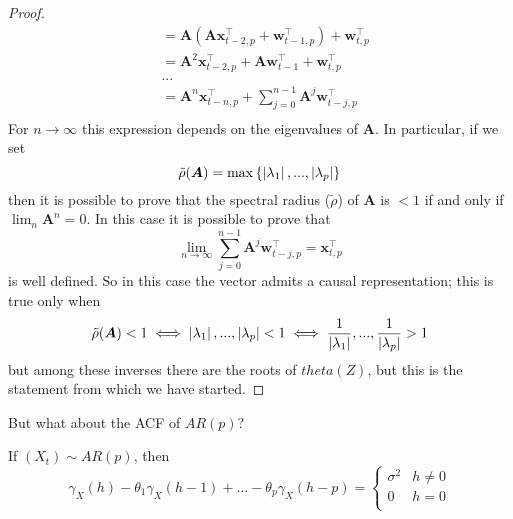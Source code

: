 \begin{proof}
\begin{equation*}
\begin{split}
            &=\boldsymbol{A}(\boldsymbol{A}\boldsymbol{x}_{t-2,p}^\intercal+\boldsymbol{w}_{t-1,p}^\intercal)+\boldsymbol{w}_{t,p}^\intercal\\
            &=\boldsymbol{A}^2\boldsymbol{x}_{t-2,p}^\intercal+\boldsymbol{A}\boldsymbol{w}_{t-1}^\intercal+\boldsymbol{w}_{t,p}^\intercal\\
            &...\\
            &=\boldsymbol{A}^n\boldsymbol{x}_{t-n,p}^\intercal+\sum_{j=0}^{n-1}\boldsymbol{A}^j\boldsymbol{w}_{t-j,p}^\intercal\\
        \end{split}
    \end{equation*}
    For $n\to\infty$ this expression depends on the eigenvalues of $\boldsymbol{A}$. In particular, if we set
    \[
        \tilde{\rho}(\boldsymbol{A})=\max\left\{\left|\lambda_1\right|,...,\left|\lambda_p\right|\right\}  
    \]
    then it is possible to prove that the spectral radius ($\tilde{\rho}$) of $\boldsymbol{A}$ is $<1$ if and only if $\lim_n\boldsymbol{A}^n=0$. In this case it is possible to prove that
    \[
        \lim_{n\to\infty}\sum_{j=0}^{n-1}\boldsymbol{A}^j\boldsymbol{w}_{t-j,p}^\intercal=\boldsymbol{x}_{t,p}^\intercal  
    \]
    is well defined. So in this case the vector admits a causal representation; this is true only when
    \[
        \tilde{\rho}(\boldsymbol{A})<1\iff\left|\lambda_1\right|,...,\left|\lambda_p\right|<1\iff\frac{1}{\left|\lambda_1\right|},...,\frac{1}{\left|\lambda_p\right|}>1  
    \]
    but among these inverses there are the roots of $theta(Z)$, but this is the statement from which we have started.
\end{proof}

But what about the ACF of $AR(p)$?

\begin{theorem}
    If $(X_t)\sim AR(p)$, then
    \[
        \gamma_X(h)-\theta_1\gamma_X(h-1)+...-\theta_p\gamma_X(h-p)=
        \begin{cases}
            \sigma^2&h\ne0\\
            0&h=0\\
        \end{cases}  
    \]
\end{theorem}

